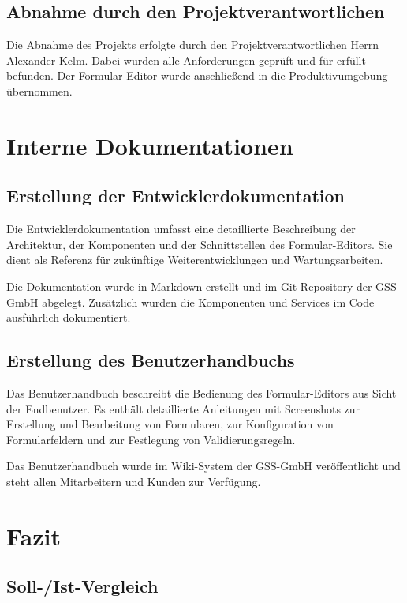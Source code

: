 \documentclass[a4paper,11pt]{article}
\begin{document}
\subsection{Abnahme durch den Projektverantwortlichen}

Die Abnahme des Projekts erfolgte durch den Projektverantwortlichen Herrn Alexander Kelm. Dabei wurden alle Anforderungen geprüft und für erfüllt befunden. Der Formular-Editor wurde anschließend in die Produktivumgebung übernommen.

\section{Interne Dokumentationen}

\subsection{Erstellung der Entwicklerdokumentation}

Die Entwicklerdokumentation umfasst eine detaillierte Beschreibung der Architektur, der Komponenten und der Schnittstellen des Formular-Editors. Sie dient als Referenz für zukünftige Weiterentwicklungen und Wartungsarbeiten.

Die Dokumentation wurde in Markdown erstellt und im Git-Repository der GSS-GmbH abgelegt. Zusätzlich wurden die Komponenten und Services im Code ausführlich dokumentiert.

\subsection{Erstellung des Benutzerhandbuchs}

Das Benutzerhandbuch beschreibt die Bedienung des Formular-Editors aus Sicht der Endbenutzer. Es enthält detaillierte Anleitungen mit Screenshots zur Erstellung und Bearbeitung von Formularen, zur Konfiguration von Formularfeldern und zur Festlegung von Validierungsregeln.

Das Benutzerhandbuch wurde im Wiki-System der GSS-GmbH veröffentlicht und steht allen Mitarbeitern und Kunden zur Verfügung.

\section{Fazit}

\subsection{Soll-/Ist-Vergleich}
\end{document}
